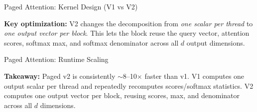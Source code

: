 \documentclass{beamer}
\begin{document}
\begin{frame}{Paged Attention: Kernel Design (V1 vs V2)}
\begin{center}
    \end{center}

    \vspace{0.15cm}
    \footnotesize
    \textbf{Key optimization:}
    V2 changes the decomposition from \emph{one scalar per thread} to
    \emph{one output vector per block}. This lets the block reuse the query vector,
    attention scores, softmax max, and softmax denominator across all $d$ output dimensions.
\end{frame}
\begin{frame}{Paged Attention: Runtime Scaling}
    \begin{table}[]
    \centering
    \caption{Paged Attention runtime on CUDA while scaling batch size at fixed $H=8$, $N=2048$, $d=64$.}
    \end{table}

    \vspace{0.1cm}
    \footnotesize
    \textbf{Takeaway:} Paged v2 is consistently $\sim$8--10$\times$ faster than v1.
    V1 computes one output scalar per thread and repeatedly recomputes scores/softmax statistics.
    V2 computes one output vector per block, reusing scores, max, and denominator across all $d$ dimensions.
\end{frame}
\end{document}
